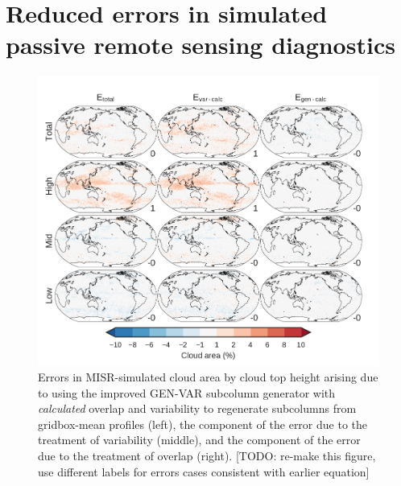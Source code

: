 \section{Reduced errors in simulated passive remote sensing
diagnostics}\label{sec:subgrid2Passive}

\begin{figure}[htbp]
\centering
\includegraphics{graphics/subgrid2_cldmisr_maps_gen-var-calc_diff.pdf}
\caption{\label{fig:cldmisrMapsCalcDiff}Errors in MISR-simulated cloud
area by cloud top height arising due to using the improved GEN-VAR
subcolumn generator with \emph{calculated} overlap and variability to
regenerate subcolumns from gridbox-mean profiles (left), the component
of the error due to the treatment of variability (middle), and the
component of the error due to the treatment of overlap (right). {[}TODO:
re-make this figure, use different labels for errors cases consistent
with earlier equation{]}}\label{fig:cldmisrMapsCalcDiff}
\end{figure}

